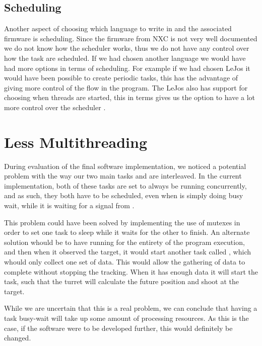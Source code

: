 \subsection{Scheduling}
Another aspect of choosing which language to write in and the associated
firmware is scheduling. Since the firmware from NXC is not very well documented
we do not know how the scheduler works, thus we do not have any control over how
the task are scheduled. If we had chosen another language we would have had more
options in terms of scheduling. For example if we had chosen LeJos it would have
been possible to create periodic tasks, this has the advantage of giving more
control of the flow in the program. The LeJos also has support for choosing when
threads are started, this in terms gives us the option to have a lot more
control over the scheduler \cite{lejosTimer}.


\section{Less Multithreading}

During evaluation of the final software implementation, we noticed a potential
problem with the way our two main tasks  and
 are interleaved. In the current implementation, both
of these tasks are set to always be running concurrently, and as such, they
both have to be scheduled, even when  is simply doing
busy wait, while it is waiting for a signal from .\nl

This problem could have been solved by implementing the use of mutexes in order
to set one task to sleep while it waits for the other to finish. An alternate
solution whould be to have  running for the entirety of the program
execution, and then when it observed the target, it would start another task
called , which whould only collect one set of data. This would
allow the gathering of data to complete without stopping the tracking. When it
has enough data it will start the  task, such that
the turret will calculate the future position and shoot at the target.\nl

While we are uncertain that this is a real problem, we can conclude that having
a task busy-wait will take up some amount of processing resources. As this is
the case, if the \name software were to be developed further, this would
definitely be changed.
